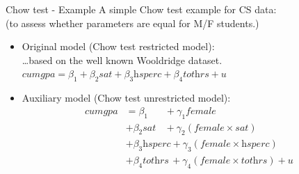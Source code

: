 \documentclass{beamer}
\begin{document}


\begin{frame}{Chow test - Example}
A simple Chow test example for CS data: 
\\(to assess whether parameters are equal for M/F students.)
\vspace{0.3cm}
\begin{itemize}

\item Original model (Chow test restricted model):
\\ \dots based on the well known Wooldridge dataset.
\vspace{0.3cm}
\\ $ \textit{cumgpa} = \beta_1 + \beta_2 \textit{sat} 
     + \beta_3\textit{hsperc}+ \beta_4 \textit{tothrs} + u $

\vspace{0.3cm}
\item Auxiliary model (Chow test unrestricted model):
\begin{equation}
\begin{aligned} 
   \textit{cumgpa} &= \beta_1  ~~~~~~~\,+\gamma_1 \textit{female}  \\
   &+ \beta_2\textit{sat} ~~~~+ \gamma_2 (\textit{female} \! \times \! \textit{sat} ) \\
   &+ \beta_3\textit{hsperc} + \gamma_3 (\textit{female} \! \times \! \textit{hsperc} ) \\ 
   &+ \beta_4 \textit{tothrs} \,+ \gamma_4(\textit{female} \! \times \! \textit{tothrs} ) + u \nonumber
\end{aligned}
\end{equation}
\end{itemize}

\end{frame}

\end{document}
